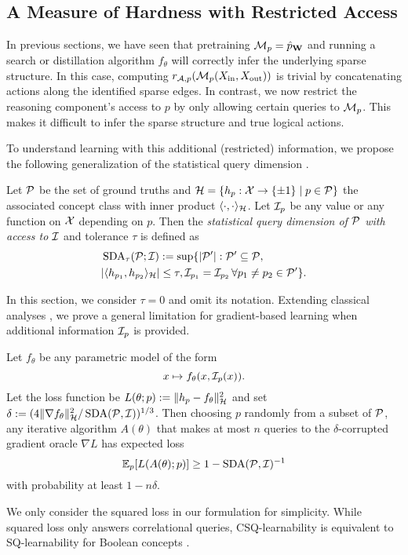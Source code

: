 \subsection{A Measure of Hardness with Restricted Access}

In previous sections, we have seen that pretraining $\mathcal{M}_p = \hat{p}_{\mathbf{W}}$ and running a search or distillation algorithm $f_\theta$ will correctly infer the underlying sparse structure. In this case, computing $r_{\mathcal{A},p}(\mathcal{M}_p(X_{\operatorname{in}},X_{\operatorname{out}}))$ is trivial by concatenating actions along the identified sparse edges. In contrast, we now restrict the reasoning component's access to $p$ by only allowing certain queries to $\mathcal{M}_p$. This makes it difficult to infer the sparse structure and true logical actions.

To understand learning with this additional (restricted) information, we propose the following generalization of the statistical query dimension \citep{Kearns98,Feldman17}.

\begin{defn}
Let $\mathcal{P}$ be the set of ground truths and $\mathcal{H}=\{h_p:\mathcal{X}\to\{\pm 1\}\mid p\in\mathcal{P}\}$ the associated concept class with inner product $\langle\cdot,\cdot\rangle_{\mathcal{H}}$. Let $\mathcal{I}_p$ be any value or any function on $\mathcal{X}$ depending on $p$. Then the \emph{statistical query dimension of $\mathcal{P}$ with access to $\mathcal{I}$} and tolerance $\tau$ is defined as
\begin{align*}
&\operatorname{SDA}_\tau(\mathcal{P};\mathcal{I}) := \sup\{|\mathcal{P}'|: \mathcal{P}'\subseteq\mathcal{P},\\
&|\langle h_{p_1},h_{p_2}\rangle_{\mathcal{H}}|\le\tau, \mathcal{I}_{p_1} = \mathcal{I}_{p_2}\,\forall p_1\ne p_2\in \mathcal{P}'\}.
\end{align*}
\end{defn}
In this section, we consider $\tau=0$ and omit its notation. Extending classical analyses \citep[e.g.,][]{Shai17,Shamir18}, we prove a general limitation for gradient-based learning when additional information $\mathcal{I}_p$ is provided.

\begin{thm}\label{thm:sda}
Let $f_\theta$ be any parametric model of the form
\begin{equation*}
x\mapsto f_\theta(x,\mathcal{I}_p(x)).
\end{equation*}
Let the loss function be $L(\theta;p) := \lVert h_p-f_\theta\rVert_{\mathcal{H}}^2$ and set $\delta:= (4\lVert\nabla f_\theta\rVert_{\mathcal{H}}^2/\operatorname{SDA}(\mathcal{P},\mathcal{I}))^{1/3}$. Then choosing $p$ randomly from a subset of $\mathcal{P}$, any iterative algorithm $A(\theta)$ that makes at most $n$ queries to the $\delta$-corrupted gradient oracle $\nabla L$ has expected loss
\begin{equation*}
\mathbb{E}_{p}[L(A(\theta);p)] \ge 1-\operatorname{SDA}(\mathcal{P},\mathcal{I})^{-1}
\end{equation*}
with probability at least $1-n\delta$.
\end{thm}
We only consider the squared loss in our formulation for simplicity. While squared loss only answers correlational queries, CSQ-learnability is equivalent to SQ-learnability for Boolean concepts \citep{Bshouty01}.

